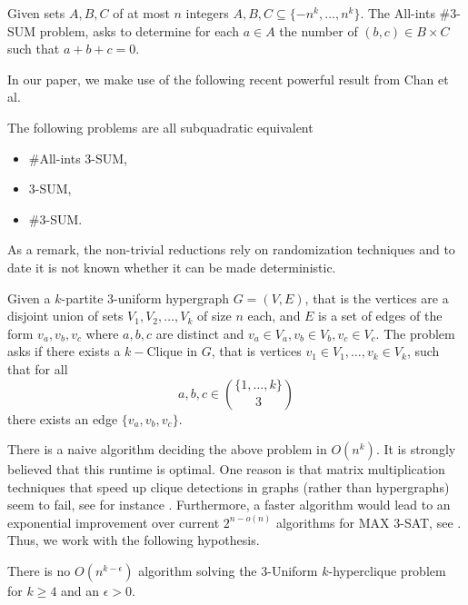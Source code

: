   \begin{definition}
    Given sets $A,B,C$ of at most $n$ integers $A,B,C \subseteq \{-n^k, \dots, n^k\}$. The All-ints $\#3$-SUM problem, asks to determine for each $a \in A$ the number of $(b,c) \in B \times C$ such that $a+b+c=0$.
  \end{definition}
    In our paper, we make use of the following recent powerful result from Chan et al. \cite{DBLP:journals/corr/abs-2303-14572}
    \begin{theorem}
    The following problems are all subquadratic equivalent
    \begin{itemize}
      \item $\#$All-ints $3$-SUM,
      \item $3$-SUM,
      \item $\#3$-SUM.
    \end{itemize}
    \label{Count3}
    \end{theorem}
As a remark, the non-trivial reductions rely on randomization techniques and to date it is not known whether it can be made deterministic.



    \begin{definition}
      Given a $k$-partite 3-uniform hypergraph $G=(V,E)$, that is the vertices are a disjoint union of sets $V_1, V_2, \dots, V_k$ of size $n$ each, and $E$ is a set of edges
      of the form ${v_a,v_b,v_c}$ where $a,b,c$ are distinct and $v_a \in V_a, v_b \in V_b , v_c \in V_c$. The problem asks if there exists a $k-$Clique in $G$, that is vertices $v_1 \in V_1, \dots, v_k \in V_k$,
      such that for all $$a,b,c \in \binom{\{1,\dots,k\}}{3}$$ there exists an edge $\{v_a, v_b,v_c \}.$
      \end{definition}
      There is a naive algorithm deciding the above problem in $O(n^k)$. It is strongly believed
      that this runtime is optimal. One reason is that matrix multiplication techniques that speed up clique detections in graphs (rather than hypergraphs) 
      seem to fail, see for instance \cite{DBLP:conf/soda/LincolnWW18}. Furthermore, a faster algorithm would lead to an exponential improvement 
      over current $2^{n-o(n)}$ algorithms for MAX 3-SAT, see \cite{DBLP:conf/sat/ChenS15,DBLP:conf/focs/AlmanCW16}.
      Thus, we work with the following hypothesis.
      \begin{hypothesis}
      There is no $O(n^{k-\epsilon})$ algorithm solving the 3-Uniform $k$-hyperclique problem for $k\geq 4$ and an $\epsilon >0$. 
      \label{hyperclique_conj}
      \end{hypothesis}
    

